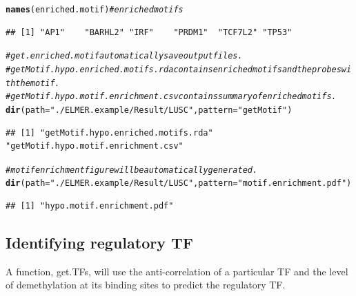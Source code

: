 \documentclass{article}\usepackage[]{graphicx}\usepackage[usenames,dvipsnames]{color}
\makeatletter
\newcommand{\hlstr}[1]{\textcolor[rgb]{0.192,0.494,0.8}{#1}}%
\newcommand{\hlcom}[1]{\textcolor[rgb]{0.678,0.584,0.686}{\textit{#1}}}%
\newcommand{\hlstd}[1]{\textcolor[rgb]{0.345,0.345,0.345}{#1}}%
\newcommand{\hlkwc}[1]{\textcolor[rgb]{0.333,0.667,0.333}{#1}}%
\newcommand{\hlkwd}[1]{\textcolor[rgb]{0.737,0.353,0.396}{\textbf{#1}}}%
\newenvironment{kframe}{%
 \def\at@end@of@kframe{}%
 \ifinner\ifhmode%
  \def\at@end@of@kframe{\end{minipage}}%
  \begin{minipage}{\columnwidth}%
 \fi\fi%
 \def\FrameCommand##1{\hskip\@totalleftmargin \hskip-\fboxsep
 \colorbox{shadecolor}{##1}\hskip-\fboxsep
     \hskip-\linewidth \hskip-\@totalleftmargin \hskip\columnwidth}%
 \MakeFramed {\advance\hsize-\width
   \@totalleftmargin\z@ \linewidth\hsize
   \@setminipage}}%
 {\par\unskip\endMakeFramed%
 \at@end@of@kframe}
\newenvironment{knitrout}{}{} %
\makeatother
\begin{document}
\begin{knitrout}
\begin{kframe}
{\ttfamily\noindent\itshape\color{messagecolor}{\#\# 6 motifs are enriched.}}\begin{alltt}
\hlkwd{names}\hlstd{(enriched.motif)}  \hlcom{# enriched motifs}
\end{alltt}
\begin{verbatim}
## [1] "AP1"    "BARHL2" "IRF"    "PRDM1"  "TCF7L2" "TP53"
\end{verbatim}
\begin{alltt}
\hlcom{# get.enriched.motif automatically save output files. }
\hlcom{# getMotif.hypo.enriched.motifs.rda contains enriched motifs and the probes with the motif. }
\hlcom{# getMotif.hypo.motif.enrichment.csv contains summary of enriched motifs.}
\hlkwd{dir}\hlstd{(}\hlkwc{path} \hlstd{=} \hlstr{"./ELMER.example/Result/LUSC"}\hlstd{,} \hlkwc{pattern} \hlstd{=} \hlstr{"getMotif"}\hlstd{)}
\end{alltt}
\begin{verbatim}
## [1] "getMotif.hypo.enriched.motifs.rda"  "getMotif.hypo.motif.enrichment.csv"
\end{verbatim}
\begin{alltt}
\hlcom{# motif enrichment figure will be automatically generated.}
\hlkwd{dir}\hlstd{(}\hlkwc{path} \hlstd{=} \hlstr{"./ELMER.example/Result/LUSC"}\hlstd{,} \hlkwc{pattern} \hlstd{=} \hlstr{"motif.enrichment.pdf"}\hlstd{)}
\end{alltt}
\begin{verbatim}
## [1] "hypo.motif.enrichment.pdf"
\end{verbatim}
\end{kframe}
\end{knitrout}


\subsection{Identifying regulatory TF}
A function, get.TFs, will use the anti-correlation of a particular TF and the level of 
demethylation at its binding sites to predict the regulatory TF.
\end{document}
